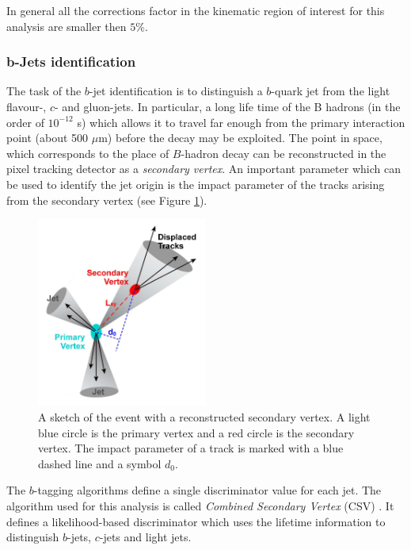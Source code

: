 In general all the corrections factor in the kinematic region of interest for this analysis are smaller then $5\%$.

\subsubsection{b-Jets identification}\label{ssec:bTag}

The task of the $b$-jet identification is to distinguish a $b$-quark jet from the light flavour-, $c$- and gluon-jets. In particular,
a long life time of the B hadrons (in the order of $10^{-12}$ s) which allows it to travel far enough from the primary interaction point (about 500 $\mu$m) before the decay
may be exploited. The point in space, which corresponds to the place of $B$-hadron decay can be reconstructed in the pixel tracking detector as a \textit{secondary vertex}. 
An important parameter which can be used to identify the jet origin is the impact parameter of the tracks arising from the secondary vertex (see Figure \ref{fig:SV}).

\begin{figure}[t]
  \centering
  \includegraphics[width=0.5\textwidth]{04_event_reconstruction/plots/btagging_cartoon.png}
  \caption{A sketch of the event with a reconstructed secondary vertex. A light blue circle is the primary vertex and a red circle is the secondary vertex. The impact 
  parameter of a track is marked with a blue dashed line and a symbol $d_{0}$.}
  \label{fig:SV}
\end{figure}

The $b$-tagging algorithms define a single discriminator value for each jet.
The algorithm used for this analysis is called \textit{Combined Secondary Vertex} (CSV) \cite{CMS-PAS-BTV-13-001}. It defines a likelihood-based discriminator which uses 
the lifetime information to distinguish $b$-jets, $c$-jets and light jets.

